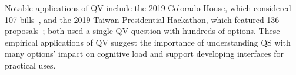 Notable applications of QV include the 2019 Colorado House, which considered 107 bills~\cite{coyNewWayVoting2019}, and the 2019 Taiwan Presidential Hackathon, which featured 136 proposals~\cite{QuadraticVotingFrontend2022}; both used a single QV question with hundreds of options. These empirical applications of QV suggest the importance of understanding QS with many options' impact on cognitive load and support developing interfaces for practical uses.